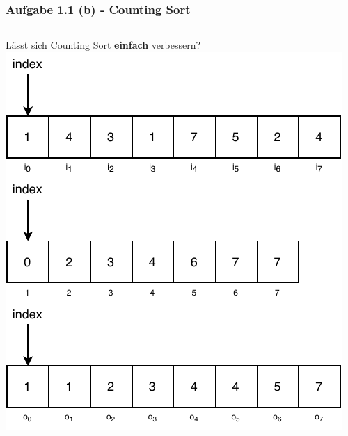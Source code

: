 \documentclass[aspectratio=169]{beamer}
\begin{document}
\begin{frame}
	\frametitle{Aufgabe 1.1 (b) - Counting Sort}
	\begin{columns}[c] %
	
	Lässt sich Counting Sort \textbf{einfach} verbessern?	
	\includegraphics[scale=.7]{cs14.pdf}
	
	\end{columns}
	\end{frame}
\end{document}
